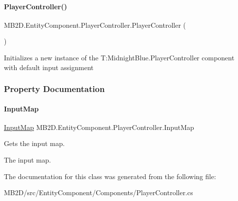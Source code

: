 \paragraph{\texorpdfstring{Player\+Controller()}{PlayerController()}}
{\footnotesize\ttfamily M\+B2\+D.\+Entity\+Component.\+Player\+Controller.\+Player\+Controller (\begin{DoxyParamCaption}{ }\end{DoxyParamCaption})\hspace{0.3cm}{\ttfamily [inline]}}



Initializes a new instance of the T\+:\+Midnight\+Blue.\+Player\+Controller component with default input assignment 



\subsubsection{Property Documentation}
\hypertarget{class_m_b2_d_1_1_entity_component_1_1_player_controller_a5fd930f90d72b416721ac93d9a81bc6d}{}\label{class_m_b2_d_1_1_entity_component_1_1_player_controller_a5fd930f90d72b416721ac93d9a81bc6d} 
\paragraph{\texorpdfstring{Input\+Map}{InputMap}}
{\footnotesize\ttfamily \hyperlink{class_m_b2_d_1_1_i_o_1_1_input_map}{Input\+Map} M\+B2\+D.\+Entity\+Component.\+Player\+Controller.\+Input\+Map\hspace{0.3cm}{\ttfamily [get]}}



Gets the input map. 

The input map.

The documentation for this class was generated from the following file\+:\begin{DoxyCompactItemize}
\item 
M\+B2\+D/src/\+Entity\+Component/\+Components/Player\+Controller.\+cs\end{DoxyCompactItemize}
